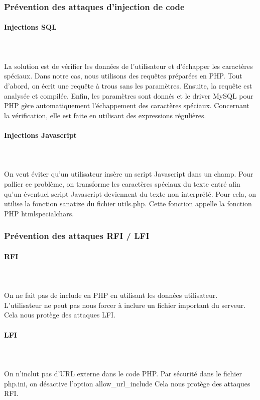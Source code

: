 \documentclass[a4paper]{article}
\begin{document}
		\subsubsection{Prévention des attaques d'injection de code}
		
\paragraph{Injections SQL}
~~\\
\\
La solution est de vérifier les données de l'utilisateur et d'échapper les caractères spéciaux.
Dans notre cas, nous utilisons des requêtes préparées en PHP.
Tout d'abord, on écrit une requête à trous sans les paramètres.
Ensuite, la requête est analysée et compilée.
Enfin, les paramètres sont donnés et le driver MySQL pour PHP gère automatiquement l'échappement des caractères spéciaux.
Concernant la vérification, elle est faite en utilisant des expressions régulières.			
		
\paragraph{Injections Javascript}
~~\\
\\
On veut éviter qu'un utilisateur insère un script Javascript dans un champ.
Pour pallier ce problème, on transforme les caractères spéciaux du texte entré afin
qu'un éventuel script Javascript deviennent du texte non interprété.
Pour cela, on utilise la fonction sanatize du fichier utils.php. Cette fonction appelle
la fonction PHP htmlspecialchars.
		
		\subsubsection{Prévention des attaques RFI / LFI}
		
\paragraph{RFI}
~~\\
\\
On ne fait pas de include en PHP en utilisant les données utilisateur.
L'utilisateur ne peut pas nous forcer à inclure un fichier important du serveur.
Cela nous protège des attaques LFI.

\paragraph{LFI}
~~\\
\\
On n'inclut pas d'URL externe dans le code PHP.
Par sécurité dans le fichier php.ini, on désactive l'option allow\_url\_include 
Cela nous protège des attaques RFI.
		
\end{document}
